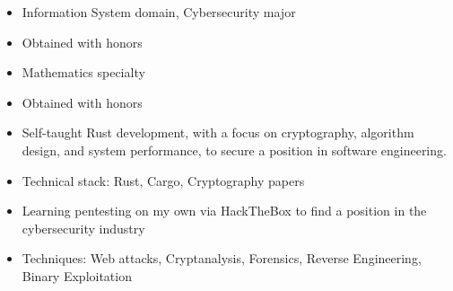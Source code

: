 \documentclass[10pt,a4paper,ragged2e,withhyper]{altacv}
\begin{document}
\begin{paracol}{2}
%

\begin{itemize}
 \item Information System domain, Cybersecurity major
 \item Obtained with honors
\end{itemize}

\divider

\begin{itemize}
\item Mathematics specialty
\item Obtained with honors
\end{itemize}


\switchcolumn


\begin{itemize}
  \item Self-taught Rust development, with a focus on cryptography, algorithm design, and system performance, to secure a position in software engineering.
  \item Technical stack: Rust, Cargo, Cryptography papers
\end{itemize}

\divider

\begin{itemize}
  \item Learning pentesting on my own via HackTheBox to find a position in the cybersecurity industry
  \item Techniques: Web attacks, Cryptanalysis, Forensics, Reverse Engineering, Binary Exploitation
\end{itemize}


\end{paracol}
\end{document}
